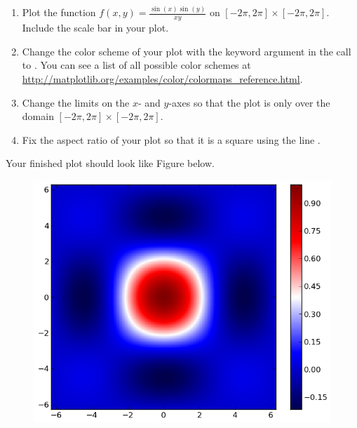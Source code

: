 \begin{problem} %
\label{prob:heatmap}
\leavevmode
\begin{enumerate}
\item Plot the function $f(x,y) = \frac{\sin(x)\sin(y)}{xy}$ on $[-2\pi,2\pi] \times [-2\pi,2\pi]$. 
Include the scale bar in your plot.
\item Change the color scheme of your plot with the keyword argument  in the call to . 
You can see a list of all possible color schemes at \url{http://matplotlib.org/examples/color/colormaps_reference.html}.
\item Change the limits on the $x$- and $y$-axes so that the plot is only over the domain $[-2\pi,2\pi] \times [-2\pi,2\pi]$.
\item Fix the aspect ratio of your plot so that it is a square using the line .
\end{enumerate}
Your finished plot should look like Figure below.

\begin{figure}[H]
\includegraphics[width=.7\textwidth]{pcolor2.png}
\end{figure}
\end{problem}


